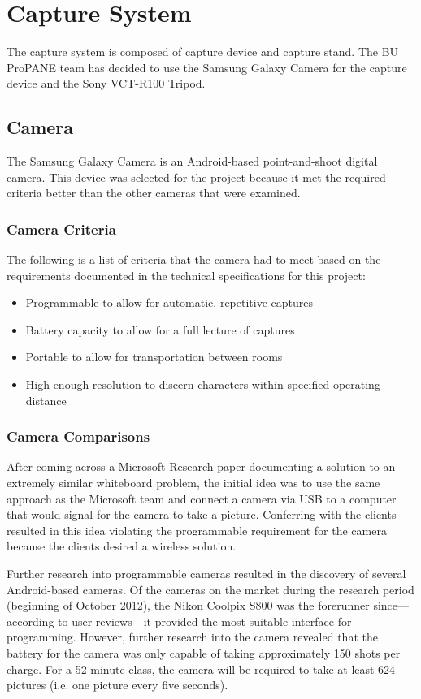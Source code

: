\documentclass[]{article}
\begin{document}
			
		
	\section{Capture System}
		The capture system is composed of capture device and capture stand. The BU ProPANE team has decided to use the Samsung Galaxy Camera for the capture device and the Sony VCT-R100 Tripod. 
			
			\subsection{Camera}
				The Samsung Galaxy Camera is an Android-based point-and-shoot digital camera. This device was selected for the project because it met the required criteria better than the other cameras that were examined. 
				
				\subsubsection{Camera Criteria}
					The following is a list of criteria that the camera had to meet based on the requirements documented in the technical specifications for this project:
					\begin{itemize}
						\item Programmable to allow for automatic, repetitive captures
						\item Battery capacity to allow for a full lecture of captures
						\item Portable to allow for transportation between rooms
						\item High enough resolution to discern characters within specified operating distance
					\end{itemize}
				
				\subsubsection{Camera Comparisons}
					After coming across a Microsoft Research paper documenting a solution to an extremely similar whiteboard problem, the initial idea was to use the same approach as the Microsoft team and connect a camera via USB to a computer that would signal for the camera to take a picture. Conferring with the clients resulted in this idea violating the programmable requirement for the camera because the clients desired a wireless solution. 
					
					Further research into programmable cameras resulted in the discovery of several Android-based cameras. Of the cameras on the market during the research period (beginning of October 2012), the Nikon Coolpix S800 was the forerunner since---according to user reviews---it provided the most suitable interface for programming. However, further research into the camera revealed that the battery for the camera was only capable of taking approximately 150 shots per charge. For a 52 minute class, the camera will be required to take at least 624 pictures (i.e. one picture every five seconds).
					
\end{document}
